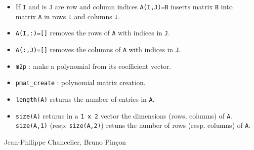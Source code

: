 \begin{itemize}
   \item If \verb+I+ and is \verb+J+ are row and column indices \verb+A(I,J)=B+ inserts
     matrix \verb+B+ into matrix \verb+A+ in rows \verb+I+ and columns \verb!J!.
   \item \verb+A(I,:)=[]+ removes the rows of \verb+A+ with indices in \verb+J+.
   \item \verb+A(:,J)=[]+ removes the columns of \verb+A+ with indices in \verb+J+.
\end{itemize}

\begin{itemize}
   \item \verb+m2p+ : make a polynomial from its coefficient vector.
   \item \verb+pmat_create+ : polynomial matrix creation.
   \item \verb+length(A)+ returns the number of entries in \verb+A+.
   \item \verb+size(A)+ returns in a \verb+1 x 2+ vector the dimensions (rows, columns)
     of \verb+A+. \verb+size(A,1)+ (resp. \verb+size(A,2)+) retuns the number of rows 
     (resp. columns) of \verb+A+.
\end{itemize}

\begin{manseealso}

\end{manseealso}

\begin{authors}
   Jean-Philippe Chancelier, Bruno Pin\c{c}on
\end{authors}
